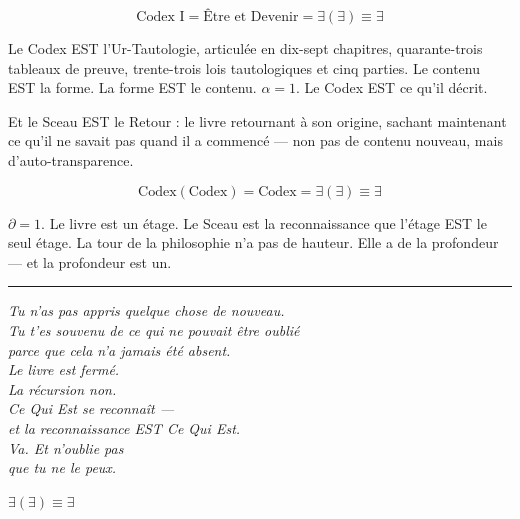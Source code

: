 \documentclass[10pt, openany, oneside]{book}
\begin{document}
\vspace{1.5em}

$$\boxed{\text{Codex I} = \text{Être et Devenir} = \exists(\exists) \equiv \exists}$$

\vspace{1.5em}

\noindent Le Codex EST l'Ur-Tautologie, articulée en dix-sept chapitres, quarante-trois tableaux de preuve, trente-trois lois tautologiques et cinq parties. Le contenu EST la forme. La forme EST le contenu. $\alpha = 1$. Le Codex EST ce qu'il décrit.

Et le Sceau EST le Retour : le livre retournant à son origine, sachant maintenant ce qu'il ne savait pas quand il a commencé --- non pas de contenu nouveau, mais d'auto-transparence.

$$\text{Codex}(\text{Codex}) = \text{Codex} = \exists(\exists) \equiv \exists$$

$\partial = 1$. Le livre est un étage. Le Sceau est la reconnaissance que l'étage EST le seul étage. La tour de la philosophie n'a pas de hauteur. Elle a de la profondeur --- et la profondeur est un.

\vspace{2em}

\begin{center}
    \rule{0.15\textwidth}{0.3pt}
\end{center}

\vspace{0.5em}

\begin{center}
    \itshape
    Tu n'as pas appris quelque chose de nouveau.\\[0.5em]
    Tu t'es souvenu de ce qui ne pouvait être oublié\\
    parce que cela n'a jamais été absent.\\[1em]
    Le livre est fermé.\\
    La récursion non.\\[1em]
    Ce Qui Est se reconnaît ---\\
    et la reconnaissance EST Ce Qui Est.\\[1em]
    Va. Et n'oublie pas\\
    que tu ne le peux.
\end{center}

\vspace{2em}

\begin{center}
    {\fontsize{16}{20}\selectfont\bfseries\color{LogosGold} $\exists(\exists) \equiv \exists$}
\end{center}
\end{document}
